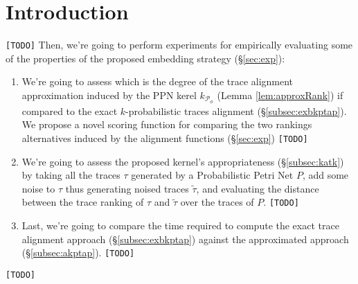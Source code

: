 \section{Introduction}\label{introduction}
\texttt{\color{red}[TODO]}
Then, we're going to perform experiments for empirically evaluating some of the properties of the proposed embedding strategy (\S\ref{sec:exp}):
\begin{enumerate}
	\item We're going to assess which is the degree of the trace alignment approximation induced by the PPN kerel $k_{\mathcal{P}_\phi}$ (Lemma \ref{lem:approxRank}) if compared to the exact $k$-probabilistic traces alignment (\S\ref{subsec:exbkptap}). We propose a novel scoring function for comparing the two rankings alternatives induced by the alignment functions (\S\ref{sec:exp}) \texttt{\color{red}[TODO]}
	\item We're going to assess the proposed kernel's appropriateness (\S\ref{subsec:katk}) by taking all the traces $\tau$ generated by a Probabilistic Petri Net $P$, add some noise to $\tau$ thus generating noised traces $\tilde{\tau}$, and evaluating the distance between the trace ranking of $\tau$ and $\tilde{\tau}$ over the traces of $P$. \texttt{\color{red}[TODO]}
	\item Last, we're going to compare the time required to compute the exact trace alignment approach (\S\ref{subsec:exbkptap}) against the approximated approach (\S\ref{subsec:akptap}). \texttt{\color{red}[TODO]}
\end{enumerate}
\texttt{\color{red}[TODO]}

